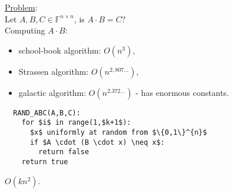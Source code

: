 \documentclass[a4paper, 12pt]{book}
\theoremstyle{definition}
\theoremstyle{remark}
\newcommand{\F}{\mathbb{F}}
\begin{document}
\underline{Problem}: \\
Let $A,B,C \in \F^{n \times n}$, is $A \cdot B = C$? \\
Computing $A \cdot B$:
\begin{itemize}
  \item school-book algorithm: $O\left(n^3\right)$,
  \item Strassen algorithm: $O\left(n^{2,807\dots}\right)$,
  \item galactic algorithm: $O\left(n^{2.372\dots}\right)$ - has enormous constants.
\end{itemize}
\begin{lstlisting}
  RAND_ABC(A,B,C):
    for $i$ in range(1,$k+1$):
      $x$ uniformly at random from $\{0,1\}^{n}$
      if $A \cdot (B \cdot x) \neq x$:
        return false
    return true
\end{lstlisting}
$O\left(k n^2\right)$. \\


\end{document}

